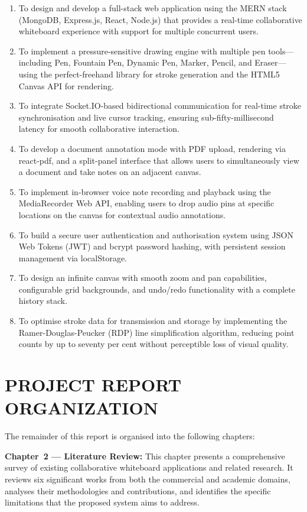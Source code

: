 \documentclass[12pt,a4paper]{report}
\begin{document}
\begin{enumerate}[label=\arabic*.]
  \item To design and develop a full-stack web application using the MERN stack (MongoDB, Express.js, React, Node.js) that provides a real-time collaborative whiteboard experience with support for multiple concurrent users.
  \item To implement a pressure-sensitive drawing engine with multiple pen tools---including Pen, Fountain Pen, Dynamic Pen, Marker, Pencil, and Eraser---using the perfect-freehand library for stroke generation and the HTML5 Canvas API for rendering.
  \item To integrate Socket.IO-based bidirectional communication for real-time stroke synchronisation and live cursor tracking, ensuring sub-fifty-millisecond latency for smooth collaborative interaction.
  \item To develop a document annotation mode with PDF upload, rendering via react-pdf, and a split-panel interface that allows users to simultaneously view a document and take notes on an adjacent canvas.
  \item To implement in-browser voice note recording and playback using the MediaRecorder Web API, enabling users to drop audio pins at specific locations on the canvas for contextual audio annotations.
  \item To build a secure user authentication and authorisation system using JSON Web Tokens (JWT) and bcrypt password hashing, with persistent session management via localStorage.
  \item To design an infinite canvas with smooth zoom and pan capabilities, configurable grid backgrounds, and undo/redo functionality with a complete history stack.
  \item To optimise stroke data for transmission and storage by implementing the Ramer-Douglas-Peucker (RDP) line simplification algorithm, reducing point counts by up to seventy per cent without perceptible loss of visual quality.
\end{enumerate}

\section{PROJECT REPORT ORGANIZATION}

The remainder of this report is organised into the following chapters:

\textbf{Chapter~2 --- Literature Review:} This chapter presents a comprehensive survey of existing collaborative whiteboard applications and related research. It reviews six significant works from both the commercial and academic domains, analyses their methodologies and contributions, and identifies the specific limitations that the proposed system aims to address.
\end{document}
